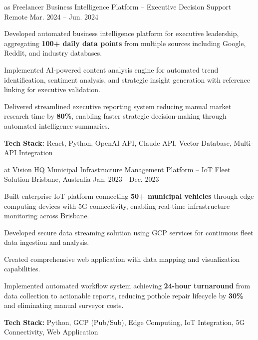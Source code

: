 \begin{cventries}
  \cventry
    {as Freelancer} %
    {Business Intelligence Platform – Executive Decision Support} %
    {Remote} %
    {Mar. 2024 – Jun. 2024} %
    {
      \begin{cvitems}
        \item {Developed automated business intelligence platform for executive leadership, aggregating \textbf{100+ daily data points} from multiple sources including Google, Reddit, and industry databases.}
        \item {Implemented AI-powered content analysis engine for automated trend identification, sentiment analysis, and strategic insight generation with reference linking for executive validation.}
        \item {Delivered streamlined executive reporting system reducing manual market research time by \textbf{80\%}, enabling faster strategic decision-making through automated intelligence summaries.}
        \item {\textbf{Tech Stack:} React, Python, OpenAI API, Claude API, Vector Database, Multi-API Integration}
      \end{cvitems}
    }

  \cventry
    {at Vision HQ} %
    {Municipal Infrastructure Management Platform – IoT Fleet Solution} %
    {Brisbane, Australia} %
    {Jan. 2023 - Dec. 2023} %
    {
      \begin{cvitems}
        \item {Built enterprise IoT platform connecting \textbf{50+ municipal vehicles} through edge computing devices with 5G connectivity, enabling real-time infrastructure monitoring across Brisbane.}
        \item {Developed secure data streaming solution using GCP services for continuous fleet data ingestion and analysis.}
        \item {Created comprehensive web application with data mapping and visualization capabilities.}
        \item {Implemented automated workflow system achieving \textbf{24-hour turnaround} from data collection to actionable reports, reducing pothole repair lifecycle by \textbf{30\%} and eliminating manual surveyor costs.}
        \item {\textbf{Tech Stack:} Python, GCP (Pub/Sub), Edge Computing, IoT Integration, 5G Connectivity, Web Application}
      \end{cvitems}
    }


\end{cventries}
